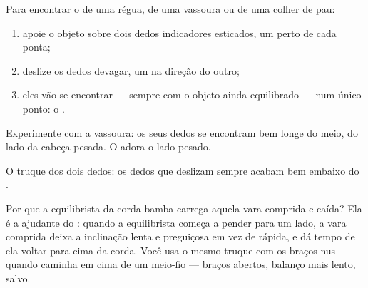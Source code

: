 \begin{method}\label{met:g2:balance-equilibrium:find}
Para encontrar o  de uma régua, de uma vassoura ou
de uma colher de pau:
\begin{enumerate}
  \item apoie o objeto sobre dois dedos indicadores esticados, um
        perto de cada ponta;
  \item deslize os dedos devagar, um na direção do outro;
  \item eles vão se encontrar --- sempre com o objeto ainda
        equilibrado --- num único ponto: o .
\end{enumerate}
Experimente com a vassoura: os seus dedos se encontram bem longe do
meio, do lado da cabeça pesada. O  adora o lado
pesado.
\end{method}

\begin{omfigure}

{\small O truque dos dois dedos: os dedos que deslizam sempre acabam
bem embaixo do .}
\end{omfigure}

\begin{example}\label{ex:g2:balance-equilibrium:acrobat}
Por que a equilibrista da corda bamba carrega aquela vara comprida e
caída? Ela é a ajudante do : quando a equilibrista começa a
pender para um lado, a vara comprida deixa a inclinação lenta e
preguiçosa em vez de rápida, e dá tempo de ela voltar para cima da
corda. Você usa o mesmo truque com os braços nus quando caminha em
cima de um meio-fio --- braços abertos, balanço mais lento,
 salvo.
\end{example}

